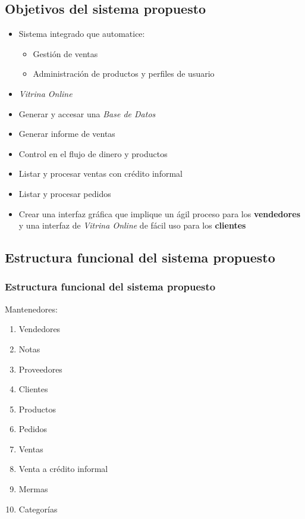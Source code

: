 \documentclass{beamer}
\begin{document}

\subsection{Objetivos del sistema propuesto}

\begin{frame}
\begin{itemize}
\frametitle{Objetivo principal del sistema propuesto}
\item Sistema integrado que automatice:
\begin{itemize}
\item Gestión de ventas
\item Administración de productos y perfiles de usuario
\end{itemize}
\item \emph{Vitrina Online}
\end{itemize}
\end{frame}

\begin{frame}
\begin{itemize}
\frametitle{Objetivo específico del sistema propuesto}
\item Generar y accesar una \emph{Base de Datos}
\item Generar informe de ventas
\item Control en el flujo de dinero y productos
\item Listar y procesar ventas con crédito informal
\item Listar y procesar pedidos
\item \alert{Crear una interfaz gráfica que implique un ágil proceso
para los \textbf{vendedores} y una interfaz de \emph{Vitrina Online} de
fácil uso para los \textbf{clientes}}
\end{itemize}
\end{frame}

\subsection{Estructura funcional del sistema propuesto}

\begin{frame}
\frametitle{Estructura funcional del sistema propuesto}
Mantenedores:
\begin{enumerate}
\item Vendedores
\item Notas
\item Proveedores
\item Clientes
\item Productos
\item Pedidos
\item Ventas
\item Venta a crédito informal
\item Mermas
\item Categorías
\end{enumerate}
\end{frame}
\end{document}
